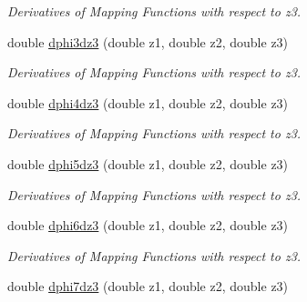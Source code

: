 \begin{DoxyCompactItemize}
\begin{DoxyCompactList}\small\item\em Derivatives of Mapping Functions with respect to z3. \item\end{DoxyCompactList}\item 
\hypertarget{classfemfunctions_a33b686701e60a39a8a70a00345433264}{
double \hyperlink{classfemfunctions_a33b686701e60a39a8a70a00345433264}{dphi3dz3} (double z1, double z2, double z3)}
\label{classfemfunctions_a33b686701e60a39a8a70a00345433264}

\begin{DoxyCompactList}\small\item\em Derivatives of Mapping Functions with respect to z3. \item\end{DoxyCompactList}\item 
\hypertarget{classfemfunctions_ac25a0df3a3e725cb60e8517ba0bf550e}{
double \hyperlink{classfemfunctions_ac25a0df3a3e725cb60e8517ba0bf550e}{dphi4dz3} (double z1, double z2, double z3)}
\label{classfemfunctions_ac25a0df3a3e725cb60e8517ba0bf550e}

\begin{DoxyCompactList}\small\item\em Derivatives of Mapping Functions with respect to z3. \item\end{DoxyCompactList}\item 
\hypertarget{classfemfunctions_ab041815b9821a011a3b77c88a3d1a835}{
double \hyperlink{classfemfunctions_ab041815b9821a011a3b77c88a3d1a835}{dphi5dz3} (double z1, double z2, double z3)}
\label{classfemfunctions_ab041815b9821a011a3b77c88a3d1a835}

\begin{DoxyCompactList}\small\item\em Derivatives of Mapping Functions with respect to z3. \item\end{DoxyCompactList}\item 
\hypertarget{classfemfunctions_a84c3151fe9205d0eaf977ff11402ee59}{
double \hyperlink{classfemfunctions_a84c3151fe9205d0eaf977ff11402ee59}{dphi6dz3} (double z1, double z2, double z3)}
\label{classfemfunctions_a84c3151fe9205d0eaf977ff11402ee59}

\begin{DoxyCompactList}\small\item\em Derivatives of Mapping Functions with respect to z3. \item\end{DoxyCompactList}\item 
\hypertarget{classfemfunctions_a34670f630023a8393e94164a30a7a607}{
double \hyperlink{classfemfunctions_a34670f630023a8393e94164a30a7a607}{dphi7dz3} (double z1, double z2, double z3)}
\label{classfemfunctions_a34670f630023a8393e94164a30a7a607}


\end{DoxyCompactItemize}
